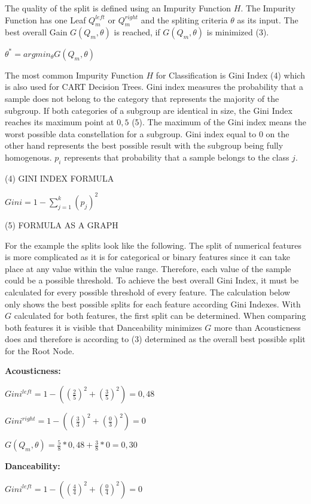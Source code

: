 The quality of the split is defined using an Impurity Function \(H\). The Impurity Function has one 
Leaf \(Q^{left}_{m}\) or \(Q^{right}_{m}\) and the spliting criteria \(\theta \) as its input. The 
best overall Gain \(G(Q_{m},\theta)\) is reached, if \(G(Q_{m},\theta)\) is minimized (3). 

\(\theta ^* = argmin_{\theta}  G(Q_{m}, \theta)\)

The most common Impurity Function \(H\) for Classification is Gini Index (4) which is also used for CART
Decision Trees. Gini index measures the probability that a sample does not belong to the category
that represents the majority of the subgroup. If both categories of a subgroup are identical in 
size, the Gini Index reaches its maximum point at \(0,5\) (5). The maximum of the Gini index means 
the worst possible data constellation for a subgroup. Gini index equal to \(0\) on the other 
hand represents the best possible result with the subgroup being fully homogenous. \(p_{i}\) represents that 
probability that a sample belongs to the class \(j\).

(4) GINI INDEX FORMULA 

\(Gini = 1 - \sum ^k_{j = 1}(p_{j})^2\)

(5) FORMULA AS A GRAPH

For the example the splits look like the following. The split of numerical features is more 
complicated as it is for categorical or binary features since it can take place at 
any value within the value range. Therefore, each value of the sample could be a possible 
threshold. To achieve the best overall Gini Index, it must be calculated for every possible 
threshold of every feature. The calculation below only shows the best possible splits for 
each feature according Gini Indexes. With \(G\) calculated for both features, the first split 
can be determined. When comparing both features it is visible that Danceability minimizes \(G\)
more than Acousticness does and therefore is according to (3) determined as the overall best possible split for 
the Root Node. 

\textbf{Acousticness:}

\(Gini^{left} = 1 - ((\frac{2}{5})^2 + (\frac{3}{5})^2) = 0,48 \)

\(Gini^{right}  = 1 - ((\frac{3}{3})^2 + (\frac{0}{3})^2) = 0 \)

\(G(Q_{m},\theta) = \frac{5}{8} * 0,48 + \frac{3}{8} * 0 = 0,30 \)

\textbf{Danceability:}

\(Gini^{left}  = 1 - ((\frac{4}{4})^2 + (\frac{0}{4})^2) = 0 \)

